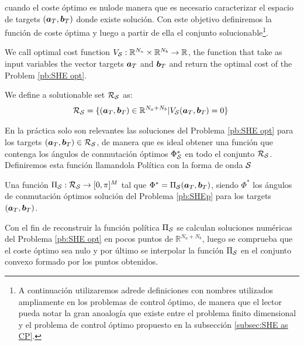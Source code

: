 \documentclass[twocolumn]{autart}    %
\begin{document}
cuando el coste óptimo es nulode manera que es necesario caracterizar el  espacio de targets $(\bm{a}_T,\bm{b}_T) $ donde existe solución. Con este objetivo definiremos la función de coste óptima y luego a partir de ella el conjunto solucionable\footnote{A continuación utilizaremos adrede definiciones con nombres utilizados ampliamente en los problemas de control óptimo, de manera que el lector pueda notar la gran anoalogía que existe entre el problema finito dimensional y el problema de control óptimo propuesto en la subsección \ref{subsec:SHE as CP}.}. 
\vspace{1em}
\begin{definition}
	We call optimal cost function $V_{\mathcal{S}}:\mathbb{R}^{N_a}\times \mathbb{R}^{N_b} \rightarrow \mathbb{R}$, the function that take as input variables the vector targets $\bm{a}_T$ and $\bm{b}_T$ and return the optimal cost of the Problem \ref{pb:SHE opt}.
\end{definition}

\vspace{1em}
\begin{definition}
	We define a solutionable set $\mathcal{R}_{\mathcal{S}}$ as:
	\begin{gather}
		\mathcal{R}_{\mathcal{S}} = \{ (\bm{a}_T,\bm{b}_T) \in \mathbb{R}^{N_a+N_b} | V_{\mathcal{S}}(\bm{a}_T,\bm{b}_T) = 0\}\
	\end{gather}
\end{definition}
En la práctica solo son relevantes las soluciones del Problema \ref{pb:SHE opt} para los targets $(\bm{a}_T,\bm{b}_T) \in \mathcal{R}_{\mathcal{S}}$, de manera que es ideal obtener una función que contenga  los ángulos de conmutación óptimos $\Phi^*_{\mathcal{S}}$ en todo el conjunto $\mathcal{R}_{\mathcal{S}}$. Definiremos  esta función llamandola Política con la forma de onda $\mathcal{S}$

\vspace{1em}
\begin{definition}
Una función $\Pi_{\mathcal{S}}: \mathcal{R}_{\mathcal{S}} \rightarrow [0,\pi]^M$ tal que $\Phi^* = \Pi_{\mathcal{S}}(\bm{a}_T,\bm{b}_T)$, siendo $\Phi^*$ los ángulos de conmutación óptimos solución del Problema \ref{pb:SHEp} para los targets $(\bm{a}_T,\bm{b}_T)$.
\end{definition} 

Con el fin de reconstruir la función política $\Pi_{\mathcal{S}}$ se calculan soluciones numéricas del Problema \ref{pb:SHE opt} en pocos puntos de $\mathbb{R}^{N_a+N_b}$, luego se comprueba que el coste óptimo sea nulo y por último se interpolar la función $\Pi_{\mathcal{S}}$ en el conjunto convexo formado por los puntos obtenidos. 
\end{document}
